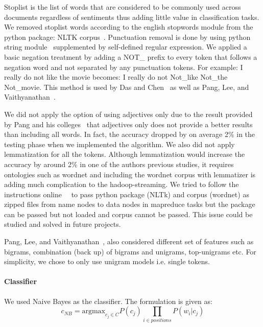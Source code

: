 Stoplist is the list of words that are considered to be commonly used across 
documents regardless of sentiments thus adding little value in classification 
tasks. We removed stoplist words according to the english stopwords 
module from the python package: NLTK 
corpus~\cite{hid-sp18-405-sentiment-stopworddoc}. Punctuation removal is 
done by using python string 
module~\cite{hid-sp18-405-sentiment-punctuationdoc} supplemented by 
self-defined regular expression. We applied a basic negation treatment by 
adding a NOT\_ prefix to every token that follows a negation word and not 
separated by any punctuation tokens. For example: I really do not like the 
movie becomes: I really do not Not\_like Not\_the Not\_movie. This method is 
used by Das and Chen~\cite{hid-sp18-405-sentiment-das2001yahoo} as well 
as Pang, Lee, and 
Vaithyanathan~\cite{hid-sp18-405-sentiment-pang2002thumbs}. 

We did not apply the option of using adjectives only due to the result 
provided by Pang and his 
colleges~\cite{hid-sp18-405-sentiment-pang2004asentimental} that  
adjectives only does not provide a better results than including all words. In 
fact, the accuracy dropped by on average 2\% in the testing phase when we 
implemented the algorithm. We also did not apply lemmatization for all the 
tokens. Although lemmatization would increase the accuracy by around 2\% 
in one of the authors previous studies, it requires ontologies such as 
wordnet and including the wordnet corpus with lemmatizer is adding much 
complication to the hadoop-streaming. We tried to follow the instructions 
online~\cite{hid-sp18-405-hadoopstreaming-nltk}~\cite{hid-sp18-405-hadoopstreaming-corpus}
 to pass python package (NLTk) and corpus (wordnet) as zipped files from 
name nodes to data nodes in mapreduce tasks but the package can be 
passed but not loaded and corpus cannot be passed. This issue could be 
studied and solved in future projects. 

Pang, Lee, and 
Vaithyanathan~\cite{hid-sp18-405-sentiment-pang2002thumbs}, also 
considered different set of 
features such as bigrams, combination (back up) of bigrams and unigrams, 
top-unigrams etc. For simplicity, we chose to only use unigram models i.e. 
single tokens. 

\paragraph{Classifier}
We  used Naive Bayes as the classifier. The formulation is given as:
\begin{equation}\label{eq:nb}
c_{NB}=\text{argmax}_{c_j \in C} P(c_j) \prod_{i \in positions} P(w_i|c_j)
\end{equation}

